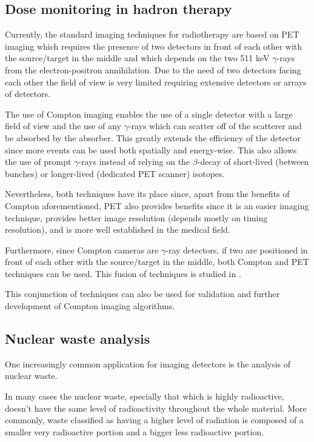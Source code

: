 \subsection{Dose monitoring in hadron therapy}

Currently, the standard imaging techniques for radiotherapy are based on PET imaging which requires the presence of two detectors in front of each other with the source/target in the middle and which depends on the two 511 keV $\gamma$-rays from the electron-positron annihilation. Due to the need of two detectors facing each other the field of view is very limited requiring extensive detectors or arrays of detectors.

The use of Compton imaging enables the use of a single detector with a large field of view and the use of any $\gamma$-rays which can scatter off of the scatterer and be absorbed by the absorber. This greatly extends the efficiency of the detector since more events can be used both spatially and energy-wise. This also allows the use of prompt $\gamma$-rays instead of relying on the $\beta$-decay of short-lived (between bunches) or longer-lived (dedicated PET scanner) isotopes.

Nevertheless, both techniques have its place since, apart from the benefits of Compton aforementioned, PET also provides benefits since it is an easier imaging technique, provides better image resolution (depends mostly on timing resolution), and is more well established in the medical field.

Furthermore, since Compton cameras are $\gamma$-ray detectors, if two are positioned in front of each other with the source/target in the middle, both Compton and PET techniques can be used. This fusion of techniques is studied in \cite{}.

This conjunction of techniques can also be used for validation and further development of Compton imaging algorithms.

\subsection{Nuclear waste analysis}

One increasingly common application for imaging detectors is the analysis of nuclear waste.

In many cases the nuclear waste, specially that which is highly radioactive, doesn't have the same level of radioactivity throughout the whole material. More commonly, waste classified as having a higher level of radiation is composed of a smaller very radioactive portion and a bigger less radioactive portion. 

